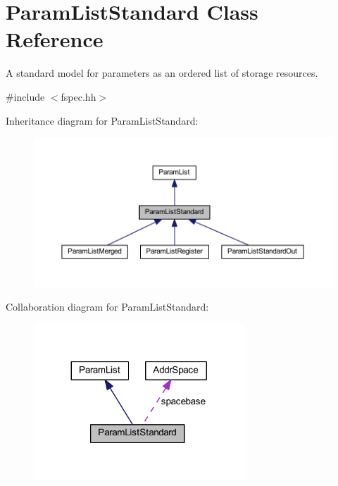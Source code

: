 \hypertarget{class_param_list_standard}{}\section{Param\+List\+Standard Class Reference}
\label{class_param_list_standard}


A standard model for parameters as an ordered list of storage resources.  




{\ttfamily \#include $<$fspec.\+hh$>$}



Inheritance diagram for Param\+List\+Standard\+:
\nopagebreak
\begin{figure}[H]
\begin{center}
\leavevmode
\includegraphics[width=350pt]{class_param_list_standard__inherit__graph}
\end{center}
\end{figure}


Collaboration diagram for Param\+List\+Standard\+:
\nopagebreak
\begin{figure}[H]
\begin{center}
\leavevmode
\includegraphics[width=224pt]{class_param_list_standard__coll__graph}
\end{center}
\end{figure}
